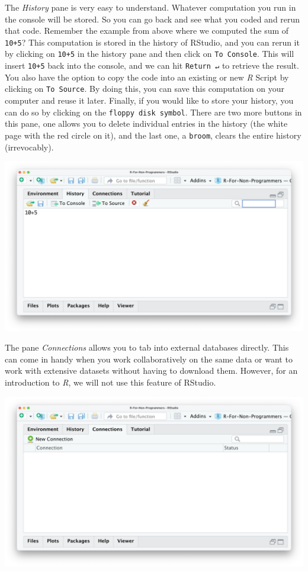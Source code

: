 \documentclass[
  letterpaper,
]{krantz}
\begin{document}
The \emph{History} pane is very easy to understand. Whatever computation
you run in the console will be stored. So you can go back and see what
you coded and rerun that code. Remember the example from above where we
computed the sum of \texttt{10+5}? This computation is stored in the
history of RStudio, and you can rerun it by clicking on \texttt{10+5} in
the history pane and then click on \texttt{To\ Console}. This will
insert \texttt{10+5} back into the console, and we can hit
\texttt{Return\ ↵} to retrieve the result. You also have the option to
copy the code into an existing or new \emph{R} Script by clicking on
\texttt{To\ Source}. By doing this, you can save this computation on
your computer and reuse it later. Finally, if you would like to store
your history, you can do so by clicking on the
\texttt{floppy\ disk\ symbol}. There are two more buttons in this pane,
one allows you to delete individual entries in the history (the white
page with the red circle on it), and the last one, a \texttt{broom},
clears the entire history (irrevocably).

\includegraphics{images/chapter_04_img/04_environment_history_etc/02_rstudio_history.png}

The pane \emph{Connections} allows you to tab into external databases
directly. This can come in handy when you work collaboratively on the
same data or want to work with extensive datasets without having to
download them. However, for an introduction to \emph{R}, we will not use
this feature of RStudio.

\includegraphics{images/chapter_04_img/04_environment_history_etc/03_rstudio_connections.png}
\end{document}
